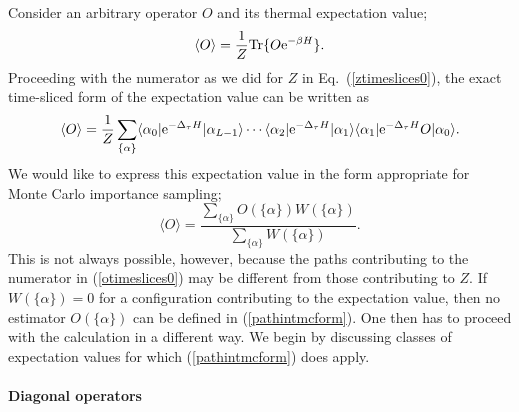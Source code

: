 \documentclass[draft,numberedheadings]{aipproc}
\begin{document}
Consider an arbitrary operator $O$ and its thermal expectation value;
\begin{equation}
\langle O\rangle = \frac{1}{Z}{\rm Tr}\{O{\rm e}^{-\beta H}\}.
\end{equation}
Proceeding with the numerator as we did for $Z$ in 
Eq.~(\ref{ztimeslices0}), the exact time-sliced form of the expectation value can be written as
\begin{equation}
\langle O\rangle =
\frac{1}{Z} \sum_{\{\alpha\}}
\langle \alpha_0|{\rm e}^{-\Delta_\tau H}|\alpha_{L-1}\rangle \cdots
\langle \alpha_{2}|{\rm e}^{-\Delta_\tau H}|\alpha_1\rangle
\langle \alpha_{1}|{\rm e}^{-\Delta_\tau H}O|\alpha_0\rangle.
\label{otimeslices0}
\end{equation}
We would like to express this expectation value in the form appropriate for Monte Carlo importance sampling;
\begin{equation}
\langle O\rangle = \frac{\sum_{\{\alpha\}}O(\{\alpha\})W(\{\alpha\})} {\sum_{\{\alpha\}}W(\{\alpha\})}.
\label{pathintmcform}
\end{equation}
This is not always possible, however, because the paths contributing to the numerator in (\ref{otimeslices0}) may be different from those contributing 
to $Z$. If $W(\{\alpha\})=0$ for a configuration contributing to the expectation value, then no estimator $O(\{\alpha\})$ can be defined in (\ref{pathintmcform}). 
One then has to proceed with the calculation in a different way. We begin by discussing classes of expectation values for which (\ref{pathintmcform}) does apply.

\paragraph{Diagonal operators}
\end{document}
